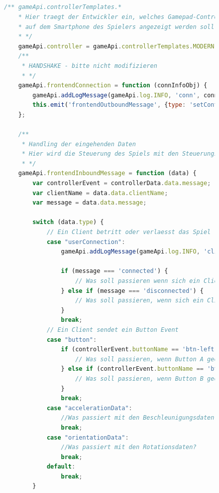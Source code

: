 \documentclass[a4paper]{spie}  %
\begin{document}
\appendix
\begin{appendices}
  \renewcommand\thetable{\thesection\arabic{table}}
  \renewcommand\thefigure{\thesection\arabic{figure}}
\section{}
\begin{figure}[H]\label{lst:CodeSnippetGameApi}
	\centering
        \begin{lstlisting}[language=JavaScript,caption={Nutzen der GampApi}]
    /** gameApi.controllerTemplates.*
    * Hier traegt der Entwickler ein, welches Gamepad-Controller Layout
    * auf dem Smartphone des Spielers angezeigt werden soll
    * */
    gameApi.controller = gameApi.controllerTemplates.MODERN;
    /**
     * HANDSHAKE - bitte nicht modifizieren
     * */
    gameApi.frontendConnection = function (connInfoObj) {
        gameApi.addLogMessage(gameApi.log.INFO, 'conn', connInfoObj + " " + gameApi.socket.id);
        this.emit('frontendOutboundMessage', {type: 'setControllerTemplate', data: gameApi.controller});
    };

    /**
     * Handling der eingehenden Daten
     * Hier wird die Steuerung des Spiels mit den Steuerungsdaten vom Smartphone kombiniert
     * */
    gameApi.frontendInboundMessage = function (data) {
        var controllerEvent = controllerData.data.message;
        var clientName = data.data.clientName;
        var message = data.data.message;

        switch (data.type) {
            // Ein Client betritt oder verlaesst das Spiel
            case "userConnection":
                gameApi.addLogMessage(gameApi.log.INFO, 'client', 'Client ' + clientName + ' ' + message);

                if (message === 'connected') {
                    // Was soll passieren wenn sich ein Client ins Spiel einloggt
                } else if (message === 'disconnected') {
                    // Was soll passieren, wenn sich ein Client das Spiel verlaesst
                }
                break;
            // Ein Client sendet ein Button Event
            case "button":
                if (controllerEvent.buttonName == 'btn-left' && controllerEvent.buttonState === gameApi.BUTTON.DOWN) {
                    // Was soll passieren, wenn Button A gedrueckt wird
                } else if (controllerEvent.buttonName == 'btn-right' && controllerEvent.buttonState === gameApi.BUTTON.DOWN) {
                    // Was soll passieren, wenn Button B gedrueckt wird
                }
                break;
            case "accelerationData":
                //Was passiert mit den Beschleunigungsdaten?
                break;
            case "orientationData":
                //Was passiert mit den Rotationsdaten?
                break;
            default:
                break;
        }
        \end{lstlisting}
\end{figure}

\end{appendices}
\end{document}
